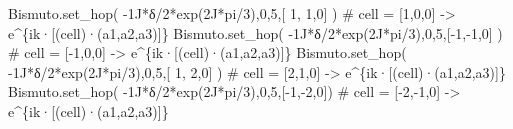 \documentclass[
  letterpaper,
  DIV=11,
  numbers=noendperiod]{scrreprt}
\newenvironment{Shaded}{\begin{snugshade}}{\end{snugshade}}
\newcommand{\CommentTok}[1]{\textcolor[rgb]{0.37,0.37,0.37}{#1}}
\newcommand{\DecValTok}[1]{\textcolor[rgb]{0.68,0.00,0.00}{#1}}
\newcommand{\NormalTok}[1]{\textcolor[rgb]{0.00,0.23,0.31}{#1}}
\newcommand{\OperatorTok}[1]{\textcolor[rgb]{0.37,0.37,0.37}{#1}}
\newcommand{\OtherTok}[1]{\textcolor[rgb]{0.00,0.23,0.31}{#1}}
\begin{document}
\begin{Shaded}
\begin{Highlighting}[]
\NormalTok{Bismuto.set\_hop( }\OperatorTok{{-}}\OtherTok{1J}\OperatorTok{*}\NormalTok{δ}\OperatorTok{/}\DecValTok{2}\OperatorTok{*}\NormalTok{exp(}\OtherTok{2J}\OperatorTok{*}\NormalTok{pi}\OperatorTok{/}\DecValTok{3}\NormalTok{),}\DecValTok{0}\NormalTok{,}\DecValTok{5}\NormalTok{,[ }\DecValTok{1}\NormalTok{, }\DecValTok{1}\NormalTok{,}\DecValTok{0}\NormalTok{] ) }\CommentTok{\# cell = [1,0,0] {-}\textgreater{} e\^{}\{ik·[(cell)·(a1,a2,a3)]\}}
\NormalTok{Bismuto.set\_hop( }\OperatorTok{{-}}\OtherTok{1J}\OperatorTok{*}\NormalTok{δ}\OperatorTok{/}\DecValTok{2}\OperatorTok{*}\NormalTok{exp(}\OtherTok{2J}\OperatorTok{*}\NormalTok{pi}\OperatorTok{/}\DecValTok{3}\NormalTok{),}\DecValTok{0}\NormalTok{,}\DecValTok{5}\NormalTok{,[}\OperatorTok{{-}}\DecValTok{1}\NormalTok{,}\OperatorTok{{-}}\DecValTok{1}\NormalTok{,}\DecValTok{0}\NormalTok{] ) }\CommentTok{\# cell = [{-}1,0,0] {-}\textgreater{} e\^{}\{ik·[(cell)·(a1,a2,a3)]\}}
\NormalTok{Bismuto.set\_hop( }\OperatorTok{{-}}\OtherTok{1J}\OperatorTok{*}\NormalTok{δ}\OperatorTok{/}\DecValTok{2}\OperatorTok{*}\NormalTok{exp(}\OtherTok{2J}\OperatorTok{*}\NormalTok{pi}\OperatorTok{/}\DecValTok{3}\NormalTok{),}\DecValTok{0}\NormalTok{,}\DecValTok{5}\NormalTok{,[ }\DecValTok{1}\NormalTok{, }\DecValTok{2}\NormalTok{,}\DecValTok{0}\NormalTok{] ) }\CommentTok{\# cell = [2,1,0] {-}\textgreater{} e\^{}\{ik·[(cell)·(a1,a2,a3)]\}}
\NormalTok{Bismuto.set\_hop( }\OperatorTok{{-}}\OtherTok{1J}\OperatorTok{*}\NormalTok{δ}\OperatorTok{/}\DecValTok{2}\OperatorTok{*}\NormalTok{exp(}\OtherTok{2J}\OperatorTok{*}\NormalTok{pi}\OperatorTok{/}\DecValTok{3}\NormalTok{),}\DecValTok{0}\NormalTok{,}\DecValTok{5}\NormalTok{,[}\OperatorTok{{-}}\DecValTok{1}\NormalTok{,}\OperatorTok{{-}}\DecValTok{2}\NormalTok{,}\DecValTok{0}\NormalTok{]) }\CommentTok{\# cell = [{-}2,{-}1,0] {-}\textgreater{} e\^{}\{ik·[(cell)·(a1,a2,a3)]\}}
\end{Highlighting}
\end{Shaded}
\end{document}
